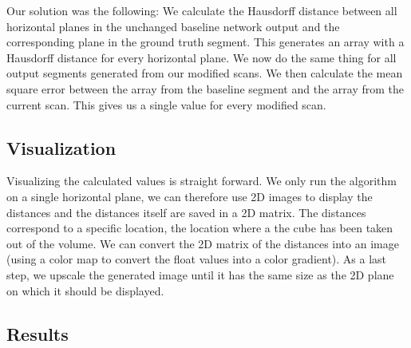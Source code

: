 Our solution was the following: We calculate the Hausdorff distance between all horizontal planes in the unchanged baseline network output and the corresponding plane in the ground truth segment.
This generates an array with a Hausdorff distance for every horizontal plane. We now do the same thing for all output segments generated from our modified scans. We then calculate the mean square error between the array from the baseline segment and the array from the current scan. This gives us a single value for every modified scan.

\subsection{Visualization}
Visualizing the calculated values is straight forward. We only run the algorithm on a single horizontal plane, we can therefore use 2D images to display the distances and the distances itself are saved in a 2D matrix. The distances correspond to a specific location, the location where a the cube has been taken out of the volume. We can convert the 2D matrix of the distances into an image (using a color map to convert the float values into a color gradient). As a last step, we upscale the generated image until it has the same size as the 2D plane on which it should be displayed.

\subsection{Results}

